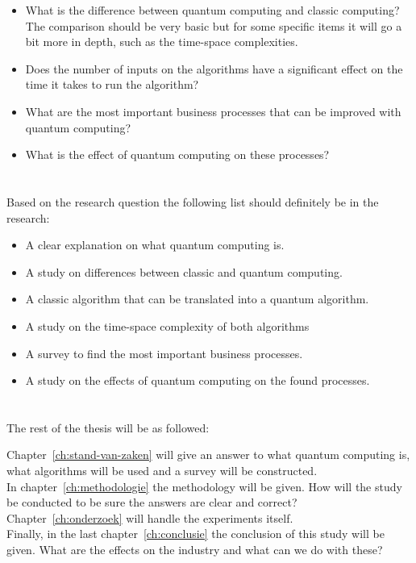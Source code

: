 \begin{itemize}
  \item What is the difference between quantum computing and classic computing? The comparison should be very basic but for some specific items it will go a bit more in depth, such as the time-space complexities.
  \item Does the number of inputs on the algorithms have a significant effect on the time it takes to run the algorithm?
  \item What are the most important business processes that can be improved with quantum computing?
  \item What is the effect of quantum computing on these processes?
\end{itemize}

\section{}
\label{sec:onderzoeksdoelstelling}

Based on the research question the following list should definitely be in the research:

\begin{itemize}
  \item A clear explanation on what quantum computing is.
  \item A study on differences between classic and quantum computing.
  \item A classic algorithm that can be translated into a quantum algorithm.
  \item A study on the time-space complexity of both algorithms
  \item A survey to find the most important business processes.
  \item A study on the effects of quantum computing on the found processes.
\end{itemize}

\section{}
\label{sec:opzet-bachelorproef}

The rest of the thesis will be as followed:

Chapter~\ref{ch:stand-van-zaken} will give an answer to what quantum computing is, what algorithms will be used and a survey will be constructed. \\
In chapter~\ref{ch:methodologie} the methodology will be given. How will the study be conducted to be sure the answers are clear and correct? \\
Chapter~\ref{ch:onderzoek} will handle the experiments itself.\\
Finally, in the last chapter~\ref{ch:conclusie} the conclusion of this study will be given. What are the effects on the industry and what can we do with these?
